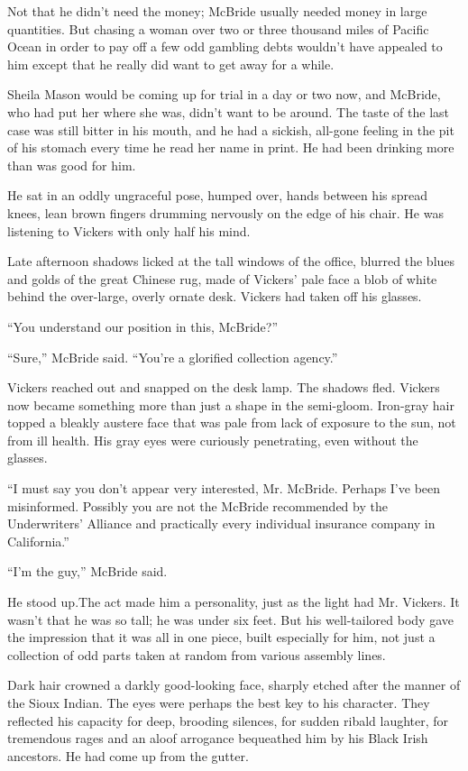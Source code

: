 \documentclass{novel}
\begin{document}
Not that he didn’t need the money; McBride usually needed money in large quantities. But chasing a woman over two or three thousand miles of Pacific Ocean in order to pay off a few odd gambling debts wouldn’t have appealed to him except that he really did want to get away for a while.

Sheila Mason would be coming up for trial in a day or two now, and McBride, who had put her where she was, didn’t want to be around. The taste of the last case was still bitter in his mouth, and he had a sickish, all-gone feeling in the pit of his stomach every time he read her name in print. He had been drinking more than was good for him.

He sat in an oddly ungraceful pose, humped over, hands between his spread knees, lean brown fingers drumming nervously on the edge of his chair. He was listening to Vickers with only half his mind.

Late afternoon shadows licked at the tall windows of the office, blurred the blues and golds of the great Chinese rug, made of Vickers’ pale face a blob of white behind the over-large, overly ornate desk. Vickers had taken off his glasses.

“You understand our position in this, McBride?”

“Sure,” McBride said. “You’re a glorified collection agency.”

Vickers reached out and snapped on the desk lamp. The shadows fled. Vickers now became something more than just a shape in the semi-gloom. Iron-gray hair topped a bleakly austere face that was pale from lack of exposure to the sun, not from ill health. His gray eyes were curiously penetrating, even without the glasses.

“I must say you don’t appear very interested, Mr. McBride. Perhaps I’ve been misinformed. Possibly you are not the McBride recommended by the Underwriters’ Alliance and practically every individual insurance company in California.”

“I’m the guy,” McBride said.

He stood up.The act made him a personality, just as the light had Mr. Vickers. It wasn’t that he was so tall; he was under six feet. But his well-tailored body gave the impression that it was all in one piece, built especially for him, not just a collection of odd parts taken at random from various assembly lines.

Dark hair crowned a darkly good-looking face, sharply etched after the manner of the Sioux Indian. The eyes were perhaps the best key to his character. They reflected his capacity for deep, brooding silences, for sudden ribald laughter, for tremendous rages and an aloof arrogance bequeathed him by his Black Irish ancestors. He had come up from the gutter.
\end{document}
